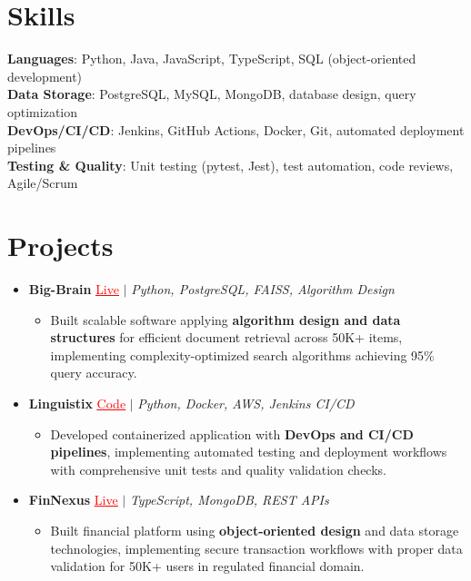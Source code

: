 \documentclass[letterpaper,10pt]{article}
\newcommand{\resumeItem}[1]{\item\small{{#1 \vspace{-2pt}}}}
\newcommand{\resumeProjectHeading}[1]{\item \small #1 \vspace{-2pt}}
\newcommand{\resumeSubHeadingListStart}{\begin{itemize}[leftmargin=0.0in, label={}]}
\newcommand{\resumeSubHeadingListEnd}{\end{itemize}}
\newcommand{\resumeProjItemListStart}{\begin{itemize}[leftmargin=0.15in,label=\textbullet,itemsep=0pt,topsep=0pt,parsep=0pt,partopsep=0pt]}
\newcommand{\resumeProjItemListEnd}{\end{itemize}\vspace{-4pt}}
\begin{document}
\section{Skills}
\begin{itemize}[leftmargin=0.15in, label={}]
\small{\item{
\textbf{Languages}: Python, Java, JavaScript, TypeScript, SQL (object-oriented development) \\
\textbf{Data Storage}: PostgreSQL, MySQL, MongoDB, database design, query optimization \\
\textbf{DevOps/CI/CD}: Jenkins, GitHub Actions, Docker, Git, automated deployment pipelines \\
\textbf{Testing \& Quality}: Unit testing (pytest, Jest), test automation, code reviews, Agile/Scrum
}}
\end{itemize}
\vspace{-16pt}
\section{Projects}
\resumeSubHeadingListStart
\vspace{-2pt}
\resumeProjectHeading{\textbf{Big-Brain} {\href{https://big-brain-pied.vercel.app/}{\textcolor{red}{\underline{Live}}}} $|$ \emph{Python, PostgreSQL, FAISS, Algorithm Design}}
\resumeProjItemListStart
\resumeItem{Built scalable software applying \textbf{algorithm design and data structures} for efficient document retrieval across 50K+ items, implementing complexity-optimized search algorithms achieving 95\% query accuracy.}
\resumeProjItemListEnd
\vspace{3pt}
\resumeProjectHeading{\textbf{Linguistix} {\href{https://github.com/SAHAJ-BHADJA/Linguistix}{\textcolor{red}{\underline{Code}}}} $|$ \emph{Python, Docker, AWS, Jenkins CI/CD}}
\resumeProjItemListStart
\resumeItem{Developed containerized application with \textbf{DevOps and CI/CD pipelines}, implementing automated testing and deployment workflows with comprehensive unit tests and quality validation checks.}
\resumeProjItemListEnd
\vspace{3pt}
\resumeProjectHeading{\textbf{FinNexus} {\href{https://fin-nexus.vercel.app/}{\textcolor{red}{\underline{Live}}}} $|$ \emph{TypeScript, MongoDB, REST APIs}}
\resumeProjItemListStart
\resumeItem{Built financial platform using \textbf{object-oriented design} and data storage technologies, implementing secure transaction workflows with proper data validation for 50K+ users in regulated financial domain.}
\resumeProjItemListEnd
\resumeSubHeadingListEnd
\end{document}
